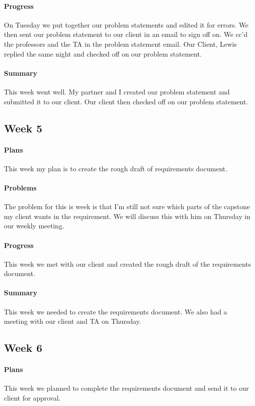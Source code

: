 \documentclass{article}
\begin{document}
\paragraph{Progress}
On Tuesday we put together our problem statements and edited it for errors. We then sent our problem statement to our client in an email to sign off on. We cc'd the professors and the TA in the problem statement email. Our Client, Lewis replied the same night and checked off on our problem statement. 
\paragraph{Summary}
This week went well. My partner and I created our problem statement and submitted it to our client. Our client then checked off on our problem statement. 
\subsection{Week 5}
\paragraph{Plans}
This week my plan is to create the rough draft of requirements document.
\paragraph{Problems}
The problem for this is week is that I'm still not sure which parts of the capstone my client wants in the requirement. We will discuss this with him on Thursday in our weekly meeting. 
\paragraph{Progress}
This week we met with our client and created the rough draft of the requirements document. 
\paragraph{Summary}
This week we needed to create the requirements document. We also had a meeting with our client and TA on Thursday. 
\subsection{Week 6}
\paragraph{Plans}
This week we planned to complete the requirements document and send it to our client for approval. 
\end{document}
